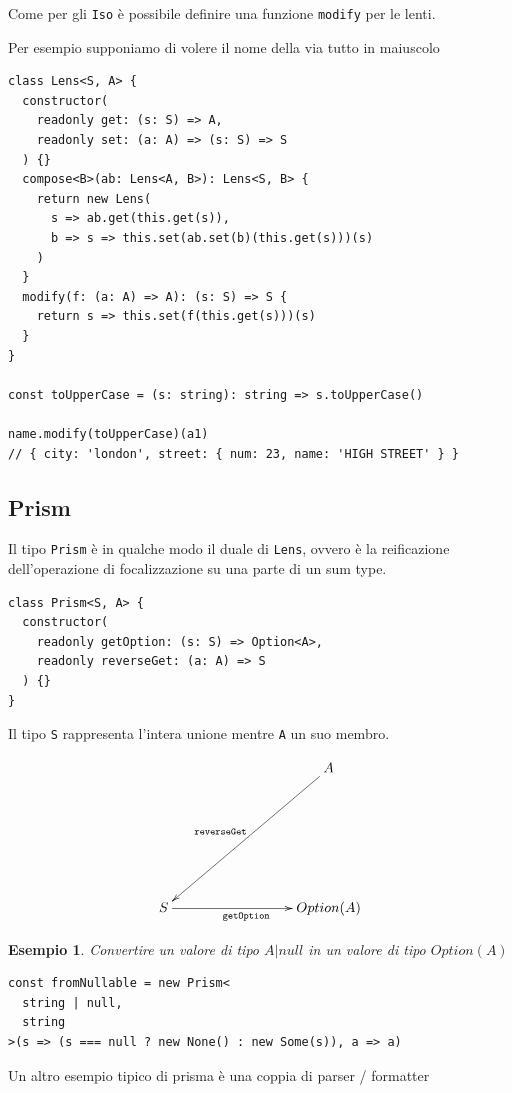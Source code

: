 \documentclass[12pt]{article}
\newtheorem{example}{Esempio}
\begin{document}
Come per gli \texttt{Iso} è possibile definire una funzione \texttt{modify} per le lenti.

Per esempio supponiamo di volere il nome della via tutto in maiuscolo

\begin{verbatim}
class Lens<S, A> {
  constructor(
    readonly get: (s: S) => A,
    readonly set: (a: A) => (s: S) => S
  ) {}
  compose<B>(ab: Lens<A, B>): Lens<S, B> {
    return new Lens(
      s => ab.get(this.get(s)),
      b => s => this.set(ab.set(b)(this.get(s)))(s)
    )
  }
  modify(f: (a: A) => A): (s: S) => S {
    return s => this.set(f(this.get(s)))(s)
  }
}

const toUpperCase = (s: string): string => s.toUpperCase()

name.modify(toUpperCase)(a1)
// { city: 'london', street: { num: 23, name: 'HIGH STREET' } }
\end{verbatim}

\subsection{Prism}

Il tipo \texttt{Prism} è in qualche modo il duale di \texttt{Lens}, ovvero è la reificazione dell'operazione di focalizzazione
su una parte di un sum type.

\begin{verbatim}
class Prism<S, A> {
  constructor(
    readonly getOption: (s: S) => Option<A>,
    readonly reverseGet: (a: A) => S
  ) {}
}
\end{verbatim}

Il tipo \texttt{S} rappresenta l'intera unione mentre \texttt{A} un suo membro.

\[
\xymatrixrowsep{3cm}
\xymatrixcolsep{3cm}
\xymatrix{
  & A \ar[dl]_{\texttt{reverseGet}} \\
  S \ar[r]_{\texttt{getOption}} & {Option(A)}
}
\]

\begin{example}
Convertire un valore di tipo $A | null$ in un valore di tipo $Option(A)$

\begin{verbatim}
const fromNullable = new Prism<
  string | null,
  string
>(s => (s === null ? new None() : new Some(s)), a => a)
\end{verbatim}

\end{example}

Un altro esempio tipico di prisma è una coppia di parser / formatter
\end{document}
